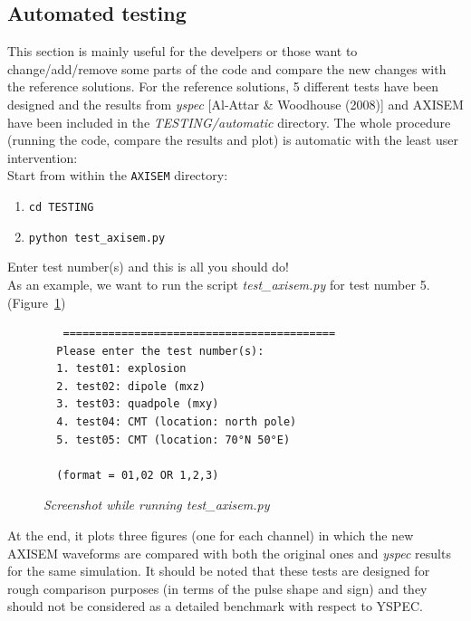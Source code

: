 \subsection{Automated testing}

This section is mainly useful for the develpers or those want to change/add/remove some parts of the code and compare the new changes with the reference solutions.
For the reference solutions, 5 different tests have been designed and
the results from \textit{yspec} [Al-Attar \& Woodhouse (2008)] and AXISEM have been included in the \textit{TESTING/automatic} directory.
The whole procedure (running the code, compare the results and plot) is automatic with the least user intervention: \\

Start from within the {\tt AXISEM} directory:
 \begin{enumerate}
 \item {\tt cd TESTING}
 \item {\tt python test\_axisem.py}
 \end{enumerate}

Enter test number(s) and this is all you should do! \\

\noindent As an example, we want to run the script \textit{test\_axisem.py} for test number 5. (Figure~\ref{test_axisem})

\begin{figure}[htb]
  \begin{verbatim}
   ==========================================
  Please enter the test number(s):
  1. test01: explosion
  2. test02: dipole (mxz)
  3. test03: quadpole (mxy)
  4. test04: CMT (location: north pole)
  5. test05: CMT (location: 70°N 50°E)

  (format = 01,02 OR 1,2,3)
  \end{verbatim}
  \caption{\textit{Screenshot while running test\_axisem.py}}
\label{test_axisem}
\end{figure}

\noindent At the end, it plots three figures (one for each channel)
in which the new AXISEM waveforms are compared with both the original ones and \textit{yspec} results for the same simulation.
It should be noted that these tests are designed for rough comparison purposes (in terms of the pulse shape and sign) and they should not be considered as a detailed benchmark with respect to YSPEC. \\

